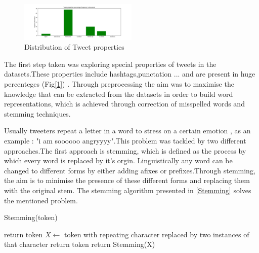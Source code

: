\documentclass[10pt,conference,compsocconf]{IEEEtran}
\begin{document}
\begin{figure}[!htb]
	\centering \includegraphics[width=0.5\textwidth]{../plots/types.png}
	\caption{Distribution of Tweet properties}
	\label{prop}
\end{figure}

The first step taken was exploring special properties of tweets in the datasets.These properties include hashtags,punctation ... and are present in huge percenteges (Fig[\ref{prop}]) . Through preprocessing the aim was to maximise the knowledge that can be extracted from the datasets in order to build word representations, which is achieved through correction of misspelled words and stemming techniques.

Usually tweeters repeat a letter in a word to stress on a certain emotion , as an example : "i am soooooo angryyyy".This problem was tackled by two different approaches.The first approach is stemming, which is defined as the process by which every word is replaced by it's orgin. Linguistically any word can be changed to different forms by either adding afixes or prefixes.Through stemming, the aim is to minimise the presence of these different forms and replacing them with the original stem. The stemming algorithm presented in \ref{Stemming} solves the mentioned problem.

\begin{algorithm}
\caption{Stemming(token)}
\label{Stemming}
\begin{algorithmic} 
\STATE return token
\ELSE
\STATE $X \leftarrow $ token with repeating character replaced by two instances of that character
\STATE return token
\ELSE
\STATE return Stemming(X)
\ENDIF
\ENDIF
\end{algorithmic}
\end{algorithm}
\end{document}
